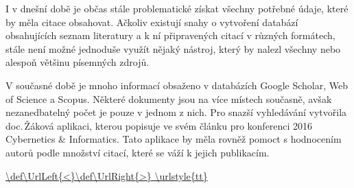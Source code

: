 \documentclass[a4paper, 11pt, final]{article}
\begin{document}
I v dnešní době je občas stále problematické získat všechny potřebné údaje, které by měla citace
obsahovat. Ačkoliv existují snahy o vytvoření databází obsahujících seznam literatury
a k ní připravených citací v různých formátech, stále není možné jednoduše využít nějaký nástroj,
který by nalezl všechny nebo alespoň většinu písemných zdrojů. \cite{zakova-tracking-resources}

V současné době je mnoho informací obsaženo v databázích Google Scholar, Web of Science a Scopus.
Některé dokumenty jsou na více místech současně, avšak nezanedbatelný počet je pouze v jednom
z nich. Pro snazší vyhledávání vytvořila doc.\,Žáková aplikaci, kterou popisuje ve svém článku
pro konferenci 2016 Cybernetics \& Informatics. Tato aplikace by měla rovněž pomoct s hodnocením
autorů podle množství citací, které se váží k jejich publikacím. \cite{zakova-tracking-resources}

\newpage
\DeclareUrlCommand\url{\def\UrlLeft{<}\def\UrlRight{>} \urlstyle{tt}}


\end{document}

